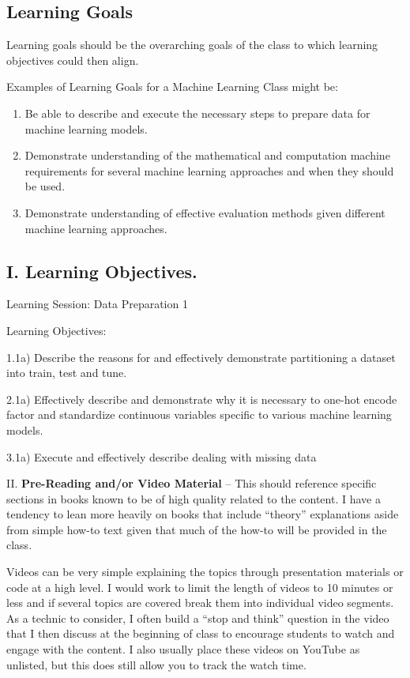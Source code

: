 \documentclass[
  letterpaper,
  DIV=11,
  numbers=noendperiod]{scrreprt}
\begin{document}
\hypertarget{learning-goals}{%
\subsection{Learning Goals}\label{learning-goals}}

Learning goals should be the overarching goals of the class to which
learning objectives could then align.

Examples of Learning Goals for a Machine Learning Class might be:

\begin{enumerate}
\def\labelenumi{\arabic{enumi}.}
\item
  Be able to describe and execute the necessary steps to prepare data
  for machine learning models.
\item
  Demonstrate understanding of the mathematical and computation machine
  requirements for several machine learning approaches and when they
  should be used.
\item
  Demonstrate understanding of effective evaluation methods given
  different machine learning approaches.
\end{enumerate}

\hypertarget{i.-learning-objectives.}{%
\subsection{I. Learning Objectives.}\label{i.-learning-objectives.}}

Learning Session: Data Preparation 1

Learning Objectives:

1.1a) Describe the reasons for and effectively demonstrate partitioning
a dataset into train, test and tune.

2.1a) Effectively describe and demonstrate why it is necessary to
one-hot encode factor and standardize continuous variables specific to
various machine learning models.

3.1a) Execute and effectively describe dealing with missing data

II. \textbf{Pre-Reading and/or Video Material} -- This should reference
specific sections in books known to be of high quality related to the
content. I have a tendency to lean more heavily on books that include
``theory'' explanations aside from simple how-to text given that much of
the how-to will be provided in the class.

Videos can be very simple explaining the topics through presentation
materials or code at a high level. I would work to limit the length of
videos to 10 minutes or less and if several topics are covered break
them into individual video segments. As a technic to consider, I often
build a ``stop and think'' question in the video that I then discuss at
the beginning of class to encourage students to watch and engage with
the content. I also usually place these videos on YouTube as unlisted,
but this does still allow you to track the watch time.
\end{document}

